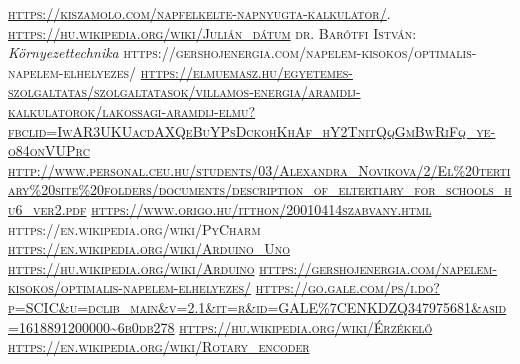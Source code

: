 \documentclass[
]{thesis-ekf}
\theoremstyle{definition}
\theoremstyle{remark}
\begin{document}
\begin{thebibliography}{2}
\textsc{\url{https://kiszamolo.com/napfelkelte-napnyugta-kalkulator/}}.
\textsc{\url{https://hu.wikipedia.org/wiki/Julián_dátum}}
\textsc{dr. Barótfi István}:  \emph{Környezettechnika}
\textsc{https://gershojenergia.com/napelem-kisokos/optimalis-napelem-elhelyezes/}
\textsc{\url{https://elmuemasz.hu/egyetemes-szolgaltatas/szolgaltatasok/villamos-energia/aramdij-kalkulatorok/lakossagi-aramdij-elmu?fbclid=IwAR3UKUacdAXQeBuYPsDckohKhAf_hY2TnitQqGmBwRiFq_ye-o84onVUPrc}}
\textsc{\url{http://www.personal.ceu.hu/students/03/Alexandra_Novikova/2/El\%20tertiary\%20site\%20folders/documents/description_of_eltertiary_for_schools_hu6_ver2.pdf}}
\textsc{\url{https://www.origo.hu/itthon/20010414szabvany.html}}
\textsc{https://en.wikipedia.org/wiki/PyCharm}
\textsc{\url{https://en.wikipedia.org/wiki/Arduino_Uno}}
\textsc{\url{https://hu.wikipedia.org/wiki/Arduino}}
\textsc{\url{https://gershojenergia.com/napelem-kisokos/optimalis-napelem-elhelyezes/}}
\textsc{\url{https://go.gale.com/ps/i.do?p=SCIC&u=dclib_main&v=2.1&it=r&id=GALE\%7CENKDZQ347975681&asid=1618891200000~6b0db278}}
\textsc{\url{https://hu.wikipedia.org/wiki/Érzékelő}}
\textsc{\url{https://en.wikipedia.org/wiki/Rotary_encoder}}
\end{thebibliography}
\end{document}
